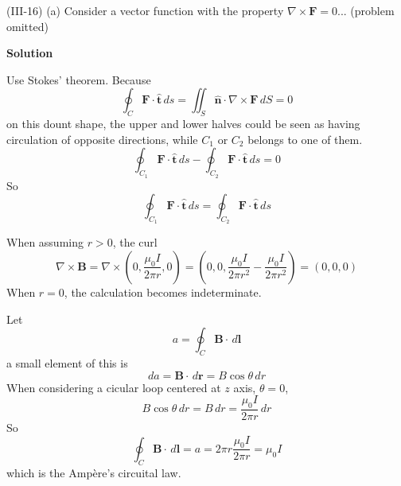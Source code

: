 \documentclass{article}
\begin{document}

\begin{homeworkProblem}
	(III-16) (a) Consider a vector function with the property $\nabla\times\mathbf{F}=0$... (problem omitted)

	\textbf{Solution}

	\begin{enumerate}[label=(\alph*)]
		\begin{item}
			Use Stokes' theorem. Because
			\[
				\oint_C\mathbf{F}\cdot\hat{\mathbf{t}}\,ds=\iint_S\hat{\mathbf{n}}\cdot\nabla\times\mathbf{F}\,dS=0
			\]
			on this dount shape, the upper and lower halves could be seen as having circulation of opposite directions, while $C_1$ or $C_2$ belongs to one of them.
			\[
				\oint_{C_1}\mathbf{F}\cdot\hat{\mathbf{t}}\,ds-\oint_{C_2}\mathbf{F}\cdot\hat{\mathbf{t}}\,ds=0
			\]
			So
			\[
				\oint_{C_1}\mathbf{F}\cdot\hat{\mathbf{t}}\,ds=\oint_{C_2}\mathbf{F}\cdot\hat{\mathbf{t}}\,ds
			\]
		\end{item}
		\begin{item}
			When assuming $r>0$, the curl
			\[
			\nabla\times\mathbf{B}=\nabla\times\left(0,\frac{\mu_0I}{2\pi r},0\right)=\left(0,0,\frac{\mu_0I}{2\pi r^2}-\frac{\mu_0I}{2\pi r^2}\right)=(0,0,0)
			\]
			When $r=0$, the calculation becomes indeterminate.
		\end{item}
		\begin{item}
			Let
			\[
				a=\oint_C\mathbf{B}\cdot\,d\mathbf{l}
			\]
			a small element of this is
			\[
				da=\mathbf{B}\cdot\,d\mathbf{r}=B\cos\theta\,dr
			\]
			When considering a cicular loop centered at $z$ axis, $\theta=0$,
			\[
				B\cos\theta\,dr=B\,dr=\frac{\mu_0I}{2\pi r}\,dr
			\]
			So
			\[
				\oint_C\mathbf{B}\cdot\,d\mathbf{l}=a=2\pi r\frac{\mu_0I}{2\pi r}=\mu_0I
			\]
			which is the Amp\`{e}re's circuital law.
		\end{item}
	\end{enumerate}
\end{homeworkProblem}

\end{document}
